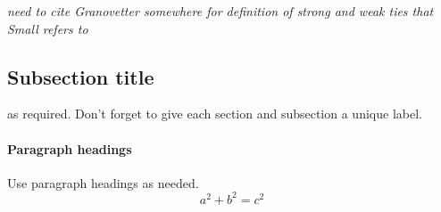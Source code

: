 \emph{need to cite Granovetter somewhere for definition of strong and weak ties that Small refers to}




%
%




\clearpage



\subsection{Subsection title}
\label{sec:2}
as required. Don't forget to give each section
and subsection a unique label.
\paragraph{Paragraph headings} Use paragraph headings as needed.
\begin{equation}
a^2+b^2=c^2
\end{equation}

